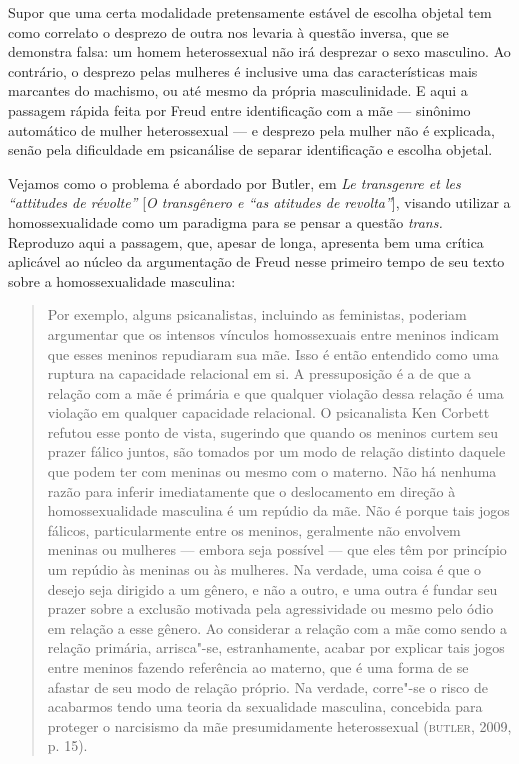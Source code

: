 Supor que uma certa modalidade pretensamente estável de escolha objetal
tem como correlato o desprezo de outra nos levaria à questão inversa,
que se demonstra falsa: um homem heterossexual não irá desprezar o
sexo masculino. Ao contrário, o desprezo pelas mulheres é inclusive uma
das características mais marcantes do machismo, ou até mesmo da própria
masculinidade. E aqui a passagem rápida feita por Freud entre
identificação com a mãe --- sinônimo automático de mulher heterossexual
--- e desprezo pela mulher não é explicada, senão pela dificuldade em
psicanálise de separar identificação e escolha objetal.

Vejamos como o problema é abordado por Butler, em \emph{Le transgenre et les
``attitudes de révolte''} {[}\emph{O transgênero e ``as atitudes de
revolta''}{]}, visando utilizar a homossexualidade como um paradigma para
se pensar a questão \emph{trans.} Reproduzo aqui a passagem, que, apesar
de longa, apresenta bem uma crítica aplicável ao núcleo da argumentação
de Freud nesse primeiro tempo de seu texto sobre a homossexualidade
masculina:

\begin{quote}
Por exemplo, alguns psicanalistas, incluindo as feministas, poderiam
argumentar que os intensos vínculos homossexuais entre meninos indicam
que esses meninos repudiaram sua mãe. Isso é então entendido como uma
ruptura na capacidade relacional em si. A pressuposição é a de que a
relação com a mãe é primária e que qualquer violação dessa relação é uma
violação em qualquer capacidade relacional. O psicanalista Ken Corbett
refutou esse ponto de vista, sugerindo que quando os meninos curtem seu
prazer fálico juntos, são tomados por um modo de relação distinto
daquele que podem ter com meninas ou mesmo com o materno. Não há nenhuma
razão para inferir imediatamente que o deslocamento em direção à
homossexualidade masculina é um repúdio da mãe. Não é porque tais jogos
fálicos, particularmente entre os meninos, geralmente não envolvem
meninas ou mulheres --- embora seja possível --- que eles têm por
princípio um repúdio às meninas ou às mulheres. Na verdade, uma coisa é
que o desejo seja dirigido a um gênero, e não a outro, e uma outra é
fundar seu prazer sobre a exclusão motivada pela agressividade ou mesmo
pelo ódio em relação a esse gênero. Ao considerar a relação com a mãe
como sendo a relação primária, arrisca"-se, estranhamente, acabar por
explicar tais jogos entre meninos fazendo referência ao materno, que é
uma forma de se afastar de seu modo de relação próprio. Na verdade,
corre"-se o risco de acabarmos tendo uma teoria da sexualidade masculina,
concebida para proteger o narcisismo da mãe presumidamente
heterossexual (\textsc{butler}, 2009, p. 15).
\end{quote}


